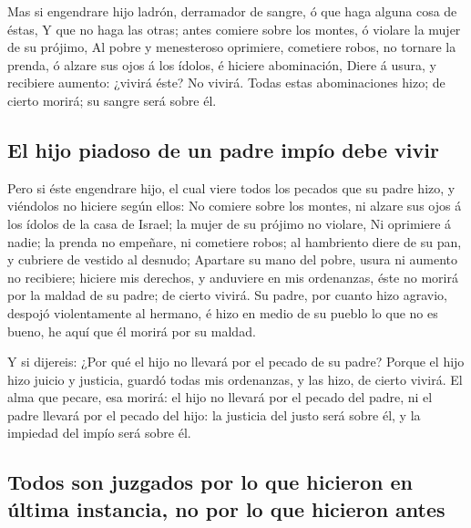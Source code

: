  Mas si engendrare hijo ladrón, derramador de sangre, ó que
haga alguna cosa de éstas,  Y que no haga las otras; antes
comiere sobre los montes, ó violare la mujer de su prójimo,
 Al pobre y menesteroso oprimiere, cometiere robos, no
tornare la prenda, ó alzare sus ojos á los ídolos, é hiciere
abominación,  Diere á usura, y recibiere aumento: ¿vivirá
éste? No vivirá. Todas estas abominaciones hizo; de cierto morirá; su
sangre será sobre él.

\hypertarget{el-hijo-piadoso-de-un-padre-impuxedo-debe-vivir}{%
\subsection{El hijo piadoso de un padre impío debe
vivir}\label{el-hijo-piadoso-de-un-padre-impuxedo-debe-vivir}}

 Pero si éste engendrare hijo, el cual viere todos los
pecados que su padre hizo, y viéndolos no hiciere según ellos:
 No comiere sobre los montes, ni alzare sus ojos á los
ídolos de la casa de Israel; la mujer de su prójimo no violare,
 Ni oprimiere á nadie; la prenda no empeñare, ni cometiere
robos; al hambriento diere de su pan, y cubriere de vestido al desnudo;
 Apartare su mano del pobre, usura ni aumento no recibiere;
hiciere mis derechos, y anduviere en mis ordenanzas, éste no morirá por
la maldad de su padre; de cierto vivirá.  Su padre, por
cuanto hizo agravio, despojó violentamente al hermano, é hizo en medio
de su pueblo lo que no es bueno, he aquí que él morirá por su maldad.

 Y si dijereis: ¿Por qué el hijo no llevará por el pecado
de su padre? Porque el hijo hizo juicio y justicia, guardó todas mis
ordenanzas, y las hizo, de cierto vivirá.  El alma que
pecare, esa morirá: el hijo no llevará por el pecado del padre, ni el
padre llevará por el pecado del hijo: la justicia del justo será sobre
él, y la impiedad del impío será sobre él.

\hypertarget{todos-son-juzgados-por-lo-que-hicieron-en-uxfaltima-instancia-no-por-lo-que-hicieron-antes}{%
\subsection{Todos son juzgados por lo que hicieron en última instancia,
no por lo que hicieron
antes}\label{todos-son-juzgados-por-lo-que-hicieron-en-uxfaltima-instancia-no-por-lo-que-hicieron-antes}}

